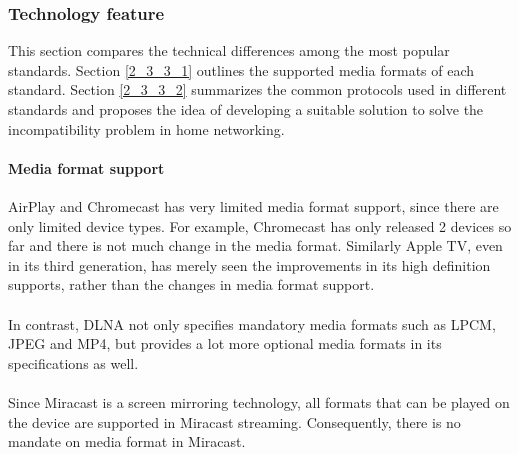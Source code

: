 \subsubsection{Technology feature\label{2_3_3}} 
This section compares the technical differences among the most popular standards. Section \ref{2_3_3_1} outlines the supported media formats of each standard. Section \ref{2_3_3_2} summarizes the common protocols used in different standards and proposes the idea of developing a suitable solution to solve the incompatibility problem in home networking.
\paragraph{Media format support\label{2_3_3_1}} 
AirPlay and Chromecast has very limited media format support, since there are 
only limited device types. For example, Chromecast has only released 2 devices so far and there is not much change in the media format. Similarly Apple TV, even in its third generation,  has merely seen the improvements in its high definition supports, rather than the changes in media format support.  \\
\\
In contrast, DLNA not only specifies mandatory media formats such as LPCM, JPEG  and MP4, but provides a lot more optional media formats in its specifications as well. \\
\\
Since Miracast is a screen mirroring technology, all formats that can be played on the device are supported in Miracast streaming. Consequently, there is no mandate on media format in Miracast.  
